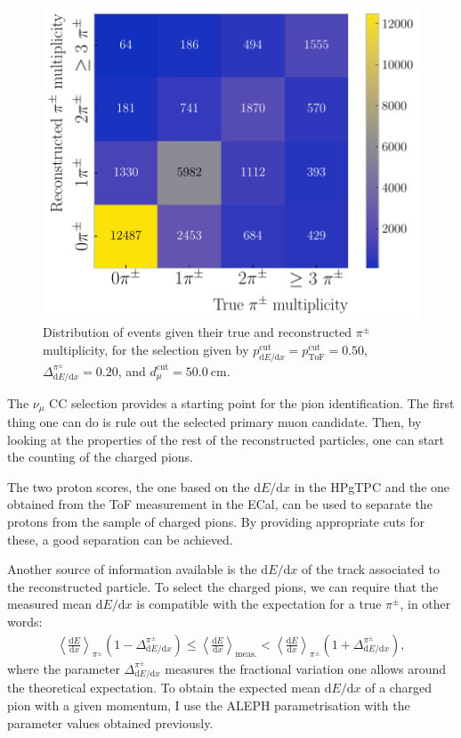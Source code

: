\begin{figure}[t]
    \centering
    \includegraphics[width=.75\linewidth]{Images/GAr_selection/pion_selection_confusion_matrix.pdf}
    \caption[Distribution of events given their true and reconstructed $\pi^{\pm}$ multiplicity, for a given selection.]{Distribution of events given their true and reconstructed $\pi^{\pm}$ multiplicity, for the selection given by $p^{\mathrm{cut}}_{\mathrm{d}E/\mathrm{d}x} = p^{\mathrm{cut}}_{\mathrm{ToF}} = 0.50$, $\Delta^{\pi^{\pm}}_{\mathrm{d}E/\mathrm{d}x} = 0.20$, and $d^{\mathrm{cut}}_{\mu} = 50.0~\mathrm{cm}$.}
    \label{fig:pion_multiplicity_example}
\end{figure}

The $\nu_{\mu}$ CC selection provides a starting point for the pion identification. The first thing one can do is rule out the selected primary muon candidate. Then, by looking at the properties of the rest of the reconstructed particles, one can start the counting of the charged pions.

The two proton scores, the one based on the $\mathrm{d}E/\mathrm{d}x$ in the HPgTPC and the one obtained from the ToF measurement in the ECal, can be used to separate the protons from the sample of charged pions. By providing appropriate cuts for these, a good separation can be achieved.

Another source of information available is the $\mathrm{d}E/\mathrm{d}x$ of the track associated to the reconstructed particle. To select the charged pions, we can require that the measured mean $\mathrm{d}E/\mathrm{d}x$ is compatible with the expectation for a true $\pi^{\pm}$, in other words:
\begin{eqnarray}
    \left<\frac{\mathrm{d}E}{\mathrm{d}x}\right>_{\pi^{\pm}} \left(1 - \Delta_{\mathrm{d}E/\mathrm{d}x}^{\pi^{\pm}}\right) \leq \left<\frac{\mathrm{d}E}{\mathrm{d}x}\right>_{\mathrm{meas.}} < \left<\frac{\mathrm{d}E}{\mathrm{d}x}\right>_{\pi^{\pm}} \left(1 + \Delta_{\mathrm{d}E/\mathrm{d}x}^{\pi^{\pm}}\right),
\end{eqnarray}
where the parameter $\Delta_{\mathrm{d}E/\mathrm{d}x}^{\pi^{\pm}}$ measures the fractional variation one allows around the theoretical expectation. To obtain the expected mean $\mathrm{d}E/\mathrm{d}x$ of a charged pion with a given momentum, I use the ALEPH parametrisation with the parameter values obtained previously.


